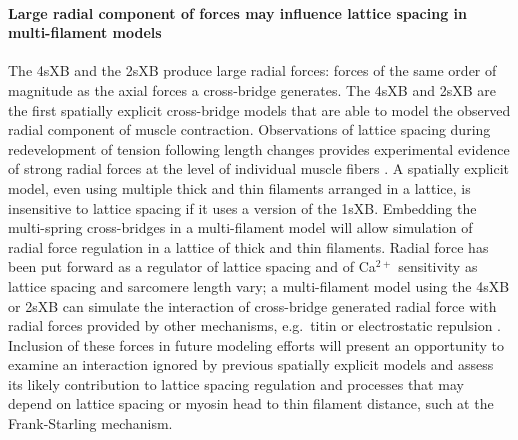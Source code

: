 \documentclass[]{article}
\begin{document}
\paragraph{Large radial component of forces may influence lattice spacing in multi-filament models} %
The 4sXB and the 2sXB produce large radial forces: forces of the same order of magnitude as the axial forces a cross-bridge generates. 
The 4sXB and 2sXB are the first spatially explicit cross-bridge models that are able to model the observed radial component of muscle contraction.
Observations of lattice spacing during redevelopment of tension following length changes provides experimental evidence of strong radial forces at the level of individual muscle fibers \citep{Cecchi1990}. %
A spatially explicit model, even using multiple thick and thin filaments arranged in a lattice, is insensitive to lattice spacing if it uses a version of the 1sXB\@.
Embedding the multi-spring cross-bridges in a multi-filament model will allow simulation of radial force regulation in a lattice of thick and thin filaments.  
Radial force has been put forward as a regulator of lattice spacing and of Ca$^{2+}$ sensitivity as lattice spacing and sarcomere length vary; a multi-filament model using the 4sXB or 2sXB can simulate the interaction of cross-bridge generated radial force with radial forces provided by other mechanisms, e.g.\ titin or electrostatic repulsion \citep{Martyn2004, Cazorla2001, Millman1998}. 
Inclusion of these forces in future modeling efforts will present an opportunity to examine an interaction ignored by previous spatially explicit models and assess its likely contribution to lattice spacing regulation and processes that may depend on lattice spacing or myosin head to thin filament distance, such at the Frank-Starling mechanism. 
\end{document}
